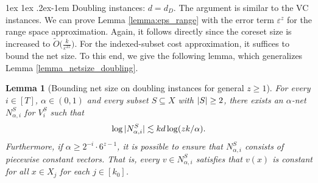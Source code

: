 \documentclass[11pt,letterpaper]{article}
\makeatletter
\renewcommand{\paragraph}{%
  \@startsection{paragraph}{4}%
  {\z@}{1ex \@plus 1ex \@minus .2ex}{-1em}%
  {\normalfont\normalsize\bfseries}%
}
\newtheorem{lemma}[theorem]{Lemma}
\theoremstyle{definition}
\newcommand{\eps}{\varepsilon}
\DeclarePairedDelimiter{\abs}{\lvert}{\rvert}
\makeatother
\begin{document}
\paragraph{Doubling instances: $d = d_D$.}
The argument is similar to the VC instances.
%
We can prove Lemma \ref{lemma:eps_range} with the error term $\eps^z$ for the range space approximation.
%
Again, it follows directly since the coreset size is increased to \( \tilde{O}\big(\frac{k}{\eps^{2z}}\big) \).
%
For the indexed-subset cost approximation, it suffices to bound the net size.
%
To this end, we give the following lemma, which generalizes Lemma \ref{lemma_netsize_doubling}.
%

\begin{lemma}[Bounding net size on doubling instances for general $z\geq 1$] \label{lemma_netsize_doubling_kzC}
    For every $i\in [T]$, $\alpha\in (0,1)$ and every subset $S\subseteq X $ with $\abs{S}\geq 2$, there exists an $\alpha$-net $N_{\alpha,i}^{S}$ for $V_{i}^S$ such that
    \[
        \log {\abs{N_{\alpha,i}^S}}\lesssim k d \log (zk/\alpha).
    \]
    Furthermore, if $\alpha \geq 2^{-i} \cdot 6^{z-1}$, it is possible to ensure that $N_{\alpha,i}^S$ consists of piecewise constant vectors. That is, every $v\in N_{\alpha,i}^S$ satisfies that $v(x)$ is constant for all $x\in X_j$ for each $j\in [k_0]$.
\end{lemma}
\end{document}

